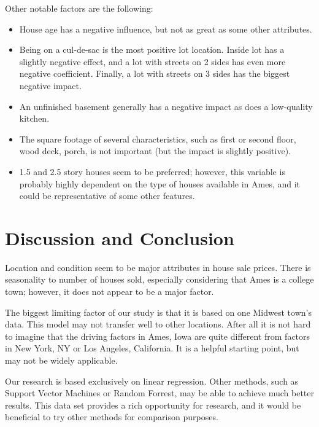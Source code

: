 \documentclass[
]{article}
\providecommand{\tightlist}{%
  \setlength{\itemsep}{0pt}\setlength{\parskip}{0pt}}
\begin{document}
Other notable factors are the following:

\begin{itemize}
\tightlist
\item
  House age has a negative influence, but not as great as some other
  attributes.
\item
  Being on a cul-de-sac is the most positive lot location. Inside lot
  has a slightly negative effect, and a lot with streets on 2 sides has
  even more negative coefficient. Finally, a lot with streets on 3 sides
  has the biggest negative impact.
\item
  An unfinished basement generally has a negative impact as does a
  low-quality kitchen.
\item
  The square footage of several characteristics, such as first or second
  floor, wood deck, porch, is not important (but the impact is slightly
  positive).
\item
  1.5 and 2.5 story houses seem to be preferred; however, this variable
  is probably highly dependent on the type of houses available in Ames,
  and it could be representative of some other features.
\end{itemize}

\hypertarget{discussion-and-conclusion}{%
\section{Discussion and Conclusion}\label{discussion-and-conclusion}}

Location and condition seem to be major attributes in house sale prices.
There is seasonality to number of houses sold, especially considering
that Ames is a college town; however, it does not appear to be a major
factor.

The biggest limiting factor of our study is that it is based on one
Midwest town's data. This model may not transfer well to other
locations. After all it is not hard to imagine that the driving factors
in Ames, Iowa are quite different from factors in New York, NY or Los
Angeles, California. It is a helpful starting point, but may not be
widely applicable.

Our research is based exclusively on linear regression. Other methods,
such as Support Vector Machines or Random Forrest, may be able to
achieve much better results. This data set provides a rich opportunity
for research, and it would be beneficial to try other methods for
comparison purposes.

\newpage
\end{document}

